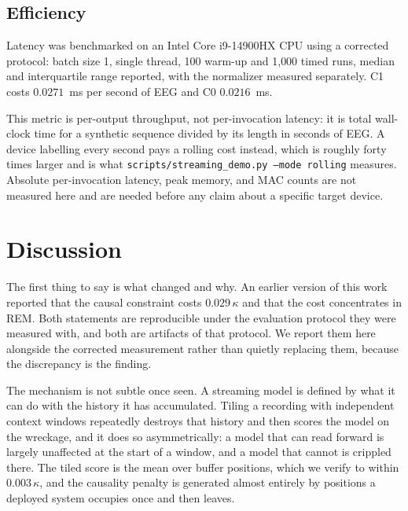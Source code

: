 \documentclass[conference]{IEEEtran}
\begin{document}
\subsection{Efficiency}

Latency was benchmarked on an Intel Core i9-14900HX CPU using a corrected protocol: batch size 1, single
thread, 100 warm-up and 1{,}000 timed runs, median and interquartile range reported, with the normalizer
measured separately. C1 costs $0.0271$~ms per second of EEG and C0 $0.0216$~ms.

This metric is per-output throughput, not per-invocation latency: it is total wall-clock time for a synthetic
sequence divided by its length in seconds of EEG. A device labelling every second pays a rolling cost instead,
which is roughly forty times larger and is what \texttt{scripts/streaming\_demo.py --mode rolling} measures.
Absolute per-invocation latency, peak memory, and MAC counts are not measured here and are needed before any
claim about a specific target device.

\section{Discussion}

The first thing to say is what changed and why. An earlier version of this work reported that the causal
constraint costs $0.029\,\kappa$ and that the cost concentrates in REM. Both statements are reproducible
under the evaluation protocol they were measured with, and both are artifacts of that protocol. We report
them here alongside the corrected measurement rather than quietly replacing them, because the discrepancy is
the finding.

The mechanism is not subtle once seen. A streaming model is defined by what it can do with the history it has
accumulated. Tiling a recording with independent context windows repeatedly destroys that history and then
scores the model on the wreckage, and it does so asymmetrically: a model that can read forward is largely
unaffected at the start of a window, and a model that cannot is crippled there. The tiled score is the mean
over buffer positions, which we verify to within $0.003\,\kappa$, and the causality penalty is generated
almost entirely by positions a deployed system occupies once and then leaves.
\end{document}
